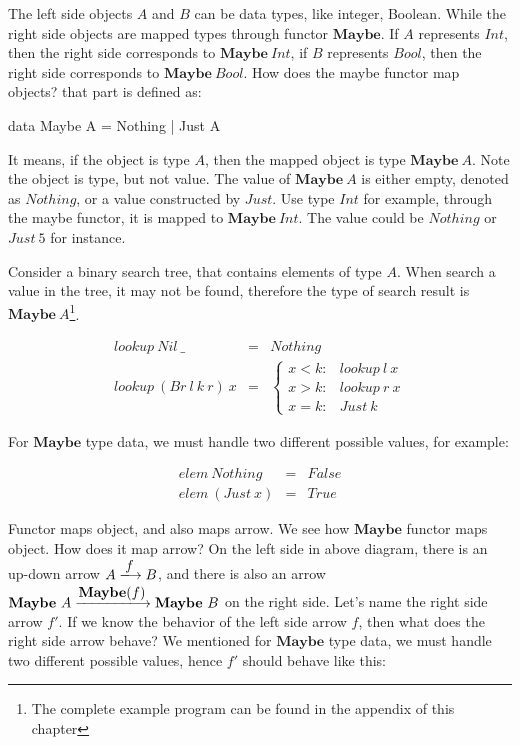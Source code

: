 \documentclass[b5paper]{article}
\begin{document}
\begin{example}
The left side objects $A$ and $B$ can be data types, like integer, Boolean. While the right side objects are mapped types through functor $\mathbf{Maybe}$. If $A$ represents $Int$, then the right side corresponds to $\mathbf{Maybe}\ Int$, if $B$ represents $Bool$, then the right side corresponds to $\mathbf{Maybe}\ Bool$. How does the maybe functor map objects? that part is defined as:

\begin{Haskell}[frame=none]
data Maybe A = Nothing | Just A
\end{Haskell}

It means, if the object is type $A$, then the mapped object is type $\mathbf{Maybe}\ A$. Note the object is type, but not value. The value of $\mathbf{Maybe}\ A$ is either empty, denoted as $Nothing$, or a value constructed by $Just$. Use type $Int$ for example, through the maybe functor, it is mapped to $\mathbf{Maybe}\ Int$. The value could be $Nothing$ or $Just\ 5$ for instance.

Consider a binary search tree, that contains elements of type $A$. When search a value in the tree, it may not be found, therefore the type of search result is $\mathbf{Maybe}\ A$\footnote{The complete example program can be found in the appendix of this chapter}.

\[
\begin{array}{rcl}
lookup\ Nil\ \_ & = & Nothing \\
lookup\ (Br\ l\ k\ r)\ x & = & \begin{cases}
  x < k: & lookup\ l\ x \\
  x > k: & lookup\ r\ x \\
  x = k: & Just\ k
\end{cases}
\end{array}
\]

For $\mathbf{Maybe}$ type data, we must handle two different possible values, for example:

\[
\begin{array}{lcl}
elem\ Nothing & = & False \\
elem\ (Just\ x) & = & True
\end{array}
\]

Functor maps object, and also maps arrow. We see how $\mathbf{Maybe}$ functor maps object. How does it map arrow? On the left side in above diagram, there is an up-down arrow $A \arrowto{f} B$, and there is also an arrow $\mathbf{Maybe}\ A \arrowto{\mathbf{Maybe}(f)} \mathbf{Maybe}\ B$ on the right side. Let's name the right side arrow $f'$. If we know the behavior of the left side arrow $f$, then what does the right side arrow behave? We mentioned for $\mathbf{Maybe}$ type data, we must handle two different possible values, hence $f'$ should behave like this:


\end{example}
\end{document}
